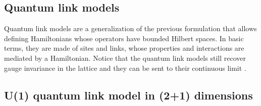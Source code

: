 \documentclass[a4paper]{report}
\begin{document}
\begin{spacing}{1.1}












\section{Quantum link models}

Quantum link models are a generalization of the previous formulation that allows defining Hamiltonians whose operators have bounded Hilbert spaces. In basic terms, they are made of sites and links, whose properties and interactions are mediated by a Hamiltonian. Notice that the quantum link models still recover gauge invariance in the lattice and they can be sent to their continuous limit \cite{wiese2013ultracold}.




\subsection{U(1) quantum link model in (2+1) dimensions}


\end{spacing}
\end{document}
